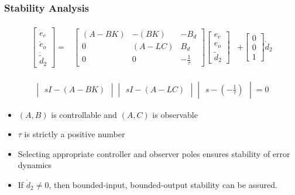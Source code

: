 \documentclass[table,10pt,red]{beamer}	%
\begin{document}
\begin{frame}
\frametitle{Stability Analysis}

\begin{eqnarray}
\begin{aligned}
\begin{bmatrix}
\dot{e}_c \\
\dot{e}_o \\
\dot{\tilde{d}}_2
\end{bmatrix} =& 
\begin{bmatrix}
(A - BK) & -(BK) & -B_d \\
0 & (A - LC) & B_d \\
0 & 0 & -\frac{1}{\tau}
\end{bmatrix}
\begin{bmatrix}
e_c \\
e_o \\
\tilde{d}_2
\end{bmatrix}	
& + 
\begin{bmatrix}
0 \\
0 \\
1
\end{bmatrix} \dot{d}_2 \label{sr8}
\end{aligned}
\end{eqnarray}

\begin{eqnarray}
\begin{vmatrix}
sI - (A - BK)
\end{vmatrix}
\begin{vmatrix}
sI - (A - LC)
\end{vmatrix}
\begin{vmatrix}
s - (-\frac{1}{\tau})
\end{vmatrix} = 0 \label{sr9}
\end{eqnarray}

\begin{itemize}
	\item $(A, B)$ is controllable and $(A, C)$ is observable
	\item $\tau$ is strictly a positive number
	\item Selecting appropriate controller and observer poles ensures stability of error dynamics
	\item If $\dot{d}_2 \ne 0$, then bounded-input, bounded-output stability can be assured. 
\end{itemize}


\end{frame}


\end{document}
